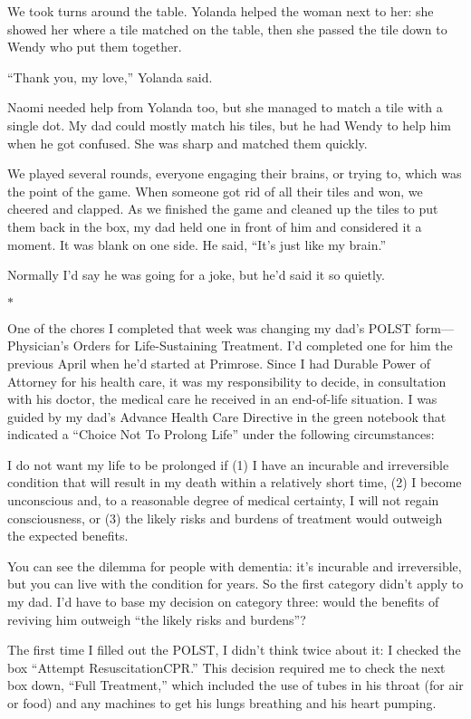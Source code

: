 \documentclass[12pt]{book}
\begin{document}
We took turns around the table. Yolanda helped the woman next to her: she showed her where a tile matched on the table, then she passed the tile down to Wendy who put them together.

``Thank you, my love,'' Yolanda said.

Naomi needed help from Yolanda too, but she managed to match a tile with a single dot. My dad could mostly match his tiles, but he had Wendy to help him when he got confused. She was sharp and matched them quickly.

We played several rounds, everyone engaging their brains, or trying to, which was the point of the game. When someone got rid of all their tiles and won, we cheered and clapped. As we finished the game and cleaned up the tiles to put them back in the box, my dad held one in front of him and considered it a moment. It was blank on one side. He said, ``It's just like my brain.''

Normally I'd say he was going for a joke, but he'd said it so quietly.

\begin{center}$*$\end{center}

One of the chores I completed that week was changing my dad's POLST form--- Physician's Orders for Life-Sustaining Treatment. I'd completed one for him the previous April when he'd started at Primrose. Since I had Durable Power of Attorney for his health care, it was my responsibility to decide, in consultation with his doctor, the medical care he received in an end-of-life situation. I was guided by my dad's Advance Health Care Directive in the green notebook that indicated a ``Choice Not To Prolong Life'' under the following circumstances:

I do not want my life to be prolonged if (1) I have an incurable and irreversible condition that will result in my death within a relatively short time, (2) I become unconscious and, to a reasonable degree of medical certainty, I will not regain consciousness, or (3) the likely risks and burdens of treatment would outweigh the expected benefits.

You can see the dilemma for people with dementia: it's incurable and irreversible, but you can live with the condition for years. So the first category didn't apply to my dad. I'd have to base my decision on category three: would the benefits of reviving him outweigh ``the likely risks and burdens''?

The first time I filled out the POLST, I didn't think twice about it: I checked the box ``Attempt Resuscitation\/CPR.'' This decision required me to check the next box down, ``Full Treatment,'' which included the use of tubes in his throat (for air or food) and any machines to get his lungs breathing and his heart pumping.
\end{document}
